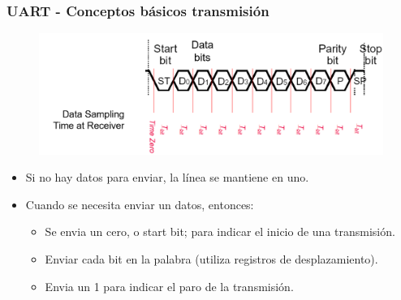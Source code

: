 \documentclass[10.5pt,scale=1.0,t,aspectratio=169,hyperref={pdfpagelabels=false}]{beamer}
\begin{document}
\frame{
	\begin{center}
		\vspace{3cm}
		\LARGE \textcolor{blue}{SERIAL ASINCRÓNICO UART \\ (Universal Asynchronous Receiver-Transmitter)}
	\end{center}
}
\begin{frame}
	\frametitle{UART - Conceptos básicos transmisión}
	
	\begin{figure}
		\centering
		\includegraphics[scale=0.3]{34_UARTConcepts}
	\end{figure}
	
	\begin{itemize}
		\item Si no hay datos para enviar, la línea se mantiene en uno.
		\item Cuando se necesita enviar un datos, entonces:
		\begin{itemize}
			\item Se envia un cero, o start bit; para indicar el inicio de una transmisión.
			\item Enviar cada bit en la palabra (utiliza registros de desplazamiento).
			\item Envia un 1 para indicar el paro de la transmisión.
		\end{itemize}
	\end{itemize}
\end{frame}
\end{document}

